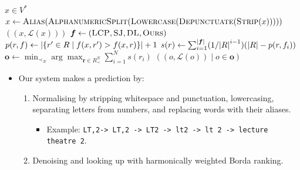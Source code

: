 \documentclass[aspectratio=169,notheorems,10pt]{beamer}
\theoremstyle{definition}
\begin{document}
\begin{frame}
\begin{algorithm}[H]
	\caption{$\textsc{Predict}(x)$}
	\begin{algorithmic}
		\Require $x\in V^{*}$
		\State $x\gets\textsc{Alias}(\textsc{AlphanumericSplit}(\textsc{Lowercase}(\textsc{Depunctuate}(\textsc{Strip}(x)))))$
			\Return $((x,\mathscr{L}(x)))$
		\EndIf
		\State ${
			\bm{f}
			\gets
			(
				\textsc{LCP}, %
				\textsc{SJ},
				\textsc{DL},
				\textsc{Ours} %
			)
		}$
				${
					p(r,f)
					\gets
					\abs{\{r'\in R\mid f(x,r')>f(x,r)\}}
					+
					1
				}$
			\EndFor
		\EndFor
			${
				s(r)
				\gets
				\sum_{i=1}^{\abs{\bm{f}}}
				(1/\abs{R}^{i-1})
				(\abs{R}-p(r,f_{i}))
			}$
		\EndFor
		\State ${
			\bm{o}
			\gets
			\min_{\prec_{N}}
			\arg\max_{\bm{r}\in R_{\prec}^{N}}
			\sum_{i=1}^{N}
			s(r_{i})
		}$
		\State \Return $((o,\mathscr{L}(o))\mid o\in\bm{o})$
	\end{algorithmic}
\end{algorithm}
\begin{itemize}
	\item Our system makes a prediction by:
	\begin{enumerate}
		\item Normalising by stripping whitespace and punctuation, lowercasing, separating letters from numbers, and replacing words with their aliases.
		\begin{itemize}
			\item Example: \texttt{\textvisiblespace LT,2\textvisiblespace -> LT,2 -> LT2 -> lt2 -> lt 2 -> lecture theatre 2}.
		\end{itemize}
		\item Denoising and looking up with harmonically weighted Borda ranking.
	\end{enumerate}
\end{itemize}
\end{frame}
\end{document}
